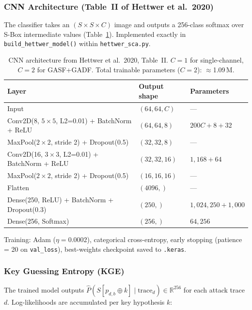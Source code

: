 \subsubsection{CNN Architecture (Table~II of Hettwer et al.\ 2020)}

The classifier takes an $(S \times S \times C)$ image and outputs a
256-class softmax over S-Box intermediate values
(Table~\ref{tab:hettwer_cnn}).
Implemented exactly in \texttt{build\_hettwer\_model()} within
\texttt{hettwer\_sca.py}.

\begin{table}[H]
\centering
\caption{CNN architecture from Hettwer et al.\ 2020, Table~II.
         $C=1$ for single-channel, $C=2$ for GASF+GADF.
         Total trainable parameters ($C=2$): $\approx$1.09\,M.}
\label{tab:hettwer_cnn}
\begin{tabular}{@{}p{7.5cm}ll@{}}
\toprule
Layer & Output shape & Parameters \\
\midrule
Input & $(64, 64, C)$ & --- \\
Conv2D(8, $5{\times}5$, L2=0.01) + BatchNorm + ReLU & $(64,64,8)$ &
  $200C{+}8{+}32$ \\
MaxPool($2{\times}2$, stride 2) + Dropout(0.5) & $(32,32,8)$ & --- \\
Conv2D(16, $3{\times}3$, L2=0.01) + BatchNorm + ReLU & $(32,32,16)$ &
  $1{,}168{+}64$ \\
MaxPool($2{\times}2$, stride 2) + Dropout(0.5) & $(16,16,16)$ & --- \\
Flatten & $(4096,)$ & --- \\
Dense(250, ReLU) + BatchNorm + Dropout(0.3) & $(250,)$ &
  $1{,}024{,}250{+}1{,}000$ \\
Dense(256, Softmax) & $(256,)$ & $64{,}256$ \\
\bottomrule
\end{tabular}
\end{table}

Training: Adam ($\eta = 0.0002$), categorical cross-entropy,
early stopping (patience = 20 on \texttt{val\_loss}),
best-weights checkpoint saved to \texttt{.keras}.

\subsubsection{Key Guessing Entropy (KGE)}

The trained model outputs
$\hat{P}(S[p_{d,b} \oplus k] \mid \text{trace}_d) \in \mathbb{R}^{256}$
for each attack trace $d$.
Log-likelihoods are accumulated per key hypothesis $k$:


